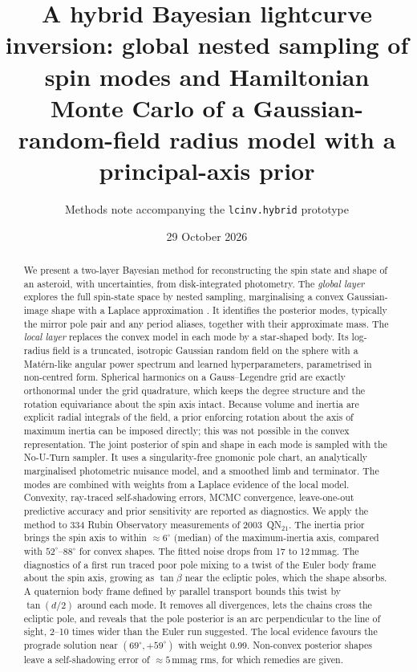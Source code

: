 \documentclass[11pt,a4paper]{article}
\title{A hybrid Bayesian lightcurve inversion: global nested sampling of spin modes and
Hamiltonian Monte Carlo of a Gaussian-random-field radius model with a principal-axis prior}
\author{Methods note accompanying the \texttt{lcinv.hybrid} prototype}
\date{29 October 2026}
\theoremstyle{remark}
\begin{document}
\maketitle

\begin{abstract}
We present a two-layer Bayesian method for reconstructing the spin state and shape of an asteroid,
with uncertainties, from disk-integrated photometry. The \emph{global layer} explores the full
spin-state space by nested sampling, marginalising a convex Gaussian-image shape with a Laplace
approximation \citep{lcinv_convex2026}. It identifies the posterior modes, typically the mirror pole
pair and any period aliases, together with their approximate mass. The \emph{local layer} replaces
the convex model in each mode by a star-shaped body. Its log-radius field is a truncated, isotropic
Gaussian random field on the sphere with a Mat\'ern-like angular power spectrum and learned
hyperparameters, parametrised in non-centred form. Spherical harmonics on a Gauss--Legendre grid are
exactly orthonormal under the grid quadrature, which keeps the degree structure and the rotation
equivariance about the spin axis intact. Because volume and inertia are explicit radial integrals of
the field, a prior enforcing rotation about the axis of maximum inertia can be imposed directly; this
was not possible in the convex representation. The joint posterior of spin and shape in each mode is
sampled with the No-U-Turn sampler. It uses a singularity-free gnomonic pole chart, an analytically
marginalised photometric nuisance model, and a smoothed limb and terminator. The modes are combined
with weights from a Laplace evidence of the local model. Convexity, ray-traced self-shadowing errors,
MCMC convergence, leave-one-out predictive accuracy and prior sensitivity are reported as diagnostics.
We apply the method to 334 Rubin Observatory measurements of 2003~QN$_{21}$. The inertia prior brings
the spin axis to within $\approx6^\circ$ (median) of the maximum-inertia axis, compared with
$52^\circ$--$88^\circ$ for convex shapes. The fitted noise drops from 17 to 12\,mmag. The diagnostics of a first run traced poor pole mixing to
a twist of the Euler body frame about the spin axis, growing as $\tan\beta$ near the ecliptic poles,
which the shape absorbs. A quaternion body frame defined by parallel transport bounds this twist by
$\tan(d/2)$ around each mode. It removes all divergences, lets the chains cross the ecliptic pole, and
reveals that the pole posterior is an arc perpendicular to the line of sight, 2--10 times wider than the
Euler run suggested. The local evidence favours the prograde solution near $(69^\circ,+59^\circ)$ with
weight 0.99. Non-convex posterior shapes leave a self-shadowing error of $\approx5$\,mmag rms, for
which remedies are given.
\end{abstract}
\end{document}
